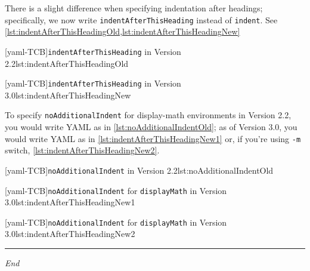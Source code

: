 	 There is a slight difference when specifying indentation after headings; specifically, we
	 now write \texttt{indentAfterThisHeading} instead of \texttt{indent}. See
	 \cref{lst:indentAfterThisHeadingOld,lst:indentAfterThisHeadingNew}

	 \begin{minipage}{.45\textwidth}
		 [yaml-TCB]{\texttt{indentAfterThisHeading} in Version 2.2}{lst:indentAfterThisHeadingOld}
	 \end{minipage}%
	 \hfill
	 \begin{minipage}{.45\textwidth}
		 [yaml-TCB]{\texttt{indentAfterThisHeading} in Version 3.0}{lst:indentAfterThisHeadingNew}
	 \end{minipage}%

	 To specify \texttt{noAdditionalIndent} for display-math environments in Version 2.2, you
	 would write YAML as in \cref{lst:noAdditionalIndentOld}; as of Version 3.0, you would
	 write YAML as in \cref{lst:indentAfterThisHeadingNew1} or, if you're using \texttt{-m}
	 switch, \cref{lst:indentAfterThisHeadingNew2}.

	 \begin{minipage}{.45\textwidth}
		 [yaml-TCB]{\texttt{noAdditionalIndent} in Version 2.2}{lst:noAdditionalIndentOld}
	 \end{minipage}%
	 \hfill
	 \begin{minipage}{.45\textwidth}
		 [yaml-TCB]{\texttt{noAdditionalIndent} for \texttt{displayMath} in Version 3.0}{lst:indentAfterThisHeadingNew1}

		 [yaml-TCB]{\texttt{noAdditionalIndent} for \texttt{displayMath} in Version 3.0}{lst:indentAfterThisHeadingNew2}
	 \end{minipage}%

	 \mbox{}\hfill
	 \begin{minipage}{.25\textwidth}
		 \hrule

		 \hfill\itshape End\\\mbox{}\hfill\mbox{}

	 \end{minipage}
